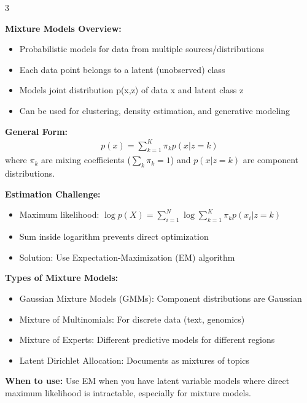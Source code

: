 \documentclass[10pt,landscape]{article}
\begin{document}
\begin{multicols}{3}
\begin{tcolorbox}[breakable, title=6. Mixture Models Concepts, colback=mixture,boxsep=1pt,left=1pt,right=1pt,top=1pt,bottom=1pt]
\textbf{Mixture Models Overview:}
\begin{itemize}[leftmargin=*,noitemsep,topsep=0pt]
    \item Probabilistic models for data from multiple sources/distributions
    \item Each data point belongs to a latent (unobserved) class
    \item Models joint distribution p(x,z) of data x and latent class z
    \item Can be used for clustering, density estimation, and generative modeling
\end{itemize}

\textbf{General Form:}
\begin{align}
p(x) = \sum_{k=1}^K \pi_k p(x|z=k)
\end{align}
where $\pi_k$ are mixing coefficients ($\sum_k \pi_k = 1$) and $p(x|z=k)$ are component distributions.

\textbf{Estimation Challenge:}
\begin{itemize}[leftmargin=*,noitemsep,topsep=0pt]
    \item Maximum likelihood: $\log p(X) = \sum_{i=1}^N \log \sum_{k=1}^K \pi_k p(x_i|z=k)$
    \item Sum inside logarithm prevents direct optimization
    \item Solution: Use Expectation-Maximization (EM) algorithm
\end{itemize}

\textbf{Types of Mixture Models:}
\begin{itemize}[leftmargin=*,noitemsep,topsep=0pt]
    \item Gaussian Mixture Models (GMMs): Component distributions are Gaussian
    \item Mixture of Multinomials: For discrete data (text, genomics)
    \item Mixture of Experts: Different predictive models for different regions
    \item Latent Dirichlet Allocation: Documents as mixtures of topics
\end{itemize}
\end{tcolorbox}

\begin{tcolorbox}[breakable, title=6.1 Expectation-Maximization (EM) Algorithm, colback=mixture,boxsep=1pt,left=1pt,right=1pt,top=1pt,bottom=1pt]
\textbf{When to use:} Use EM when you have latent variable models where direct maximum likelihood is intractable, especially for mixture models.


\end{tcolorbox}
\end{multicols}
\end{document}
